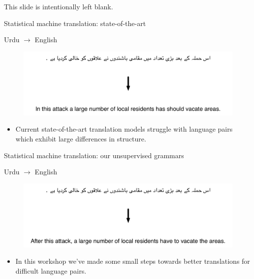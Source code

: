 \documentclass{beamer}
\begin{document}
\begin{frame}[t]{This slide is intentionally left blank.}
\end{frame}


\begin{frame}[t]{Statistical machine translation: state-of-the-art}
\begin{exampleblock}{Urdu $\rightarrow$ English}
  \begin{figure}
    {\centering \includegraphics[scale=0.55]{urdu-bl.pdf}}
  \end{figure}
\end{exampleblock}
\begin{itemize}
  \item Current state-of-the-art translation models struggle with language pairs which exhibit large differences in structure.
\end{itemize}
\end{frame}

\begin{frame}[t]{Statistical machine translation: our unsupervised grammars}
\begin{exampleblock}{Urdu $\rightarrow$ English}
  \begin{figure}
    {\centering \includegraphics[scale=0.55]{urdu-25hp.pdf}}
  \end{figure}
\end{exampleblock}
\begin{itemize}
  \item In this workshop we've made some small steps towards better translations for difficult language pairs.
\end{itemize}
\end{frame}
\end{document}
